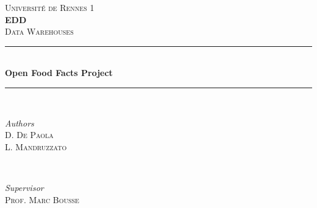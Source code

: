 \documentclass[runningheads]{llncs}
\begin{document}
%

\begin{titlepage} %
	\newcommand{\HRule}{\rule{\linewidth}{0.5mm}} %
	
	\center %
	
	\vspace{5em}
	\textsc{\LARGE Université de Rennes 1}\\[1.5cm] %
	
	\vspace{3em}
	\textsc{\Large\bfseries EDD}\\[0.5cm] %
	\textsc{\large Data Warehouses}\\[0.5cm] %
	
	
	\vspace{5em}
	\HRule\\[0.4cm]
	
	{\huge\bfseries Open Food Facts Project}\\[0.4cm] %
	
	\HRule\\[1.5cm]
	
	
	\vspace{5em}
	\begin{minipage}{0.4\textwidth}
		\begin{flushleft}
			\large
			\textit{Authors}\\
			\textsc{D. De Paola}\\
			\textsc{L. Mandruzzato}
		\end{flushleft}
	\end{minipage}
	~
	\begin{minipage}{0.4\textwidth}
		\begin{flushright}
			\large
			\textit{Supervisor}\\
			 \textsc{Prof. Marc Bousse} %
		\end{flushright}
	\end{minipage}
	

\end{titlepage}
\end{document}
